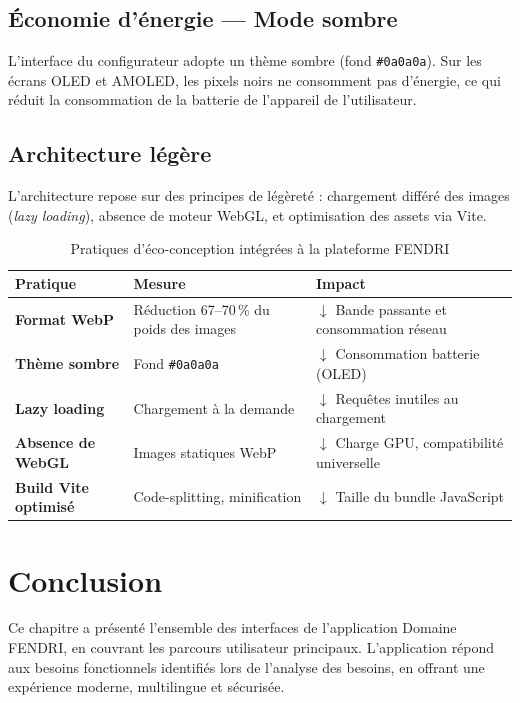 \subsection*{Économie d'énergie — Mode sombre}
L'interface du configurateur adopte un thème sombre (fond \texttt{\#0a0a0a}). Sur les écrans OLED et AMOLED, les pixels noirs ne consomment pas d'énergie, ce qui réduit la consommation de la batterie de l'appareil de l'utilisateur.

\subsection*{Architecture légère}
L'architecture repose sur des principes de légèreté : chargement différé des images (\textit{lazy loading}), absence de moteur WebGL, et optimisation des assets via Vite.

\begin{table}[H]
\centering
\caption{Pratiques d'éco-conception intégrées à la plateforme FENDRI}
\label{tab:eco}
\begin{tabularx}{\textwidth}{>{\bfseries}p{4cm} X X}
\toprule
\rowcolor{beige}
\textbf{Pratique} & \textbf{Mesure} & \textbf{Impact} \\
\midrule
Format WebP         & Réduction 67–70\,\% du poids des images & $\downarrow$ Bande passante et consommation réseau \\
Thème sombre        & Fond \texttt{\#0a0a0a}                  & $\downarrow$ Consommation batterie (OLED) \\
Lazy loading        & Chargement à la demande                 & $\downarrow$ Requêtes inutiles au chargement \\
Absence de WebGL    & Images statiques WebP                   & $\downarrow$ Charge GPU, compatibilité universelle \\
Build Vite optimisé & Code-splitting, minification             & $\downarrow$ Taille du bundle JavaScript \\
\bottomrule
\end{tabularx}
\end{table}

\section*{Conclusion}
Ce chapitre a présenté l'ensemble des interfaces de l'application Domaine FENDRI, en couvrant les parcours utilisateur principaux. L'application répond aux besoins fonctionnels identifiés lors de l'analyse des besoins, en offrant une expérience moderne, multilingue et sécurisée.
